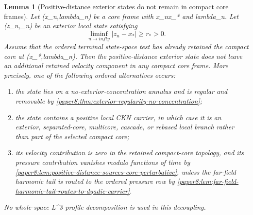 \documentclass[11pt]{amsart}
\def\({}%
\def\){}%
\def\lambda{lambda}%
\def\infty{infty}%
\theoremstyle{plain}
\newtheorem{lemma}[lemma]{Lemma}
\theoremstyle{definition}
\theoremstyle{remark}
\begin{document}
\begin{lemma}[Positive-distance exterior states do not remain in compact core frames]
\label{paper8:lem:positive-distance-exterior}
Let \((x_n,\lambda_n)\) be a core frame with \(x_n\to x_*\) and
\(\lambda_n\).  Let \((z_n,\mu_n)\) be an exterior local state satisfying
\[
  \liminf_{n\to\infty}|z_n-x_*|\ge r_*>0.
\]
Assume that the ordered terminal state-space test has already retained the
compact core at \((x_*,\lambda_n)\).  Then the positive-distance exterior state
does not leave an additional retained velocity component in any compact core
frame.  More precisely, one of the following ordered alternatives occurs:
\begin{enumerate}[label=\textup{(\roman*)}]
\item the state lies on a no-exterior-concentration annulus and is regular and
removable by \cref{paper8:thm:exterior-regularity-no-concentration};
\item the state contains a positive local CKN carrier, in which case it is an
exterior, separated-core, multicore, cascade, or rebased local branch rather
than part of the selected compact core;
\item its velocity contribution is zero in the retained compact-core topology,
and its pressure contribution vanishes modulo functions of time by
\cref{paper8:lem:positive-distance-sources-core-perturbative}, unless the
far-field harmonic tail is routed to the ordered pressure row by
\cref{paper8:lem:far-field-harmonic-tail-routes-to-dyadic-carrier}.
\end{enumerate}
No whole-space \(L^3\) profile decomposition is used in this decoupling.
\end{lemma}
\end{document}
